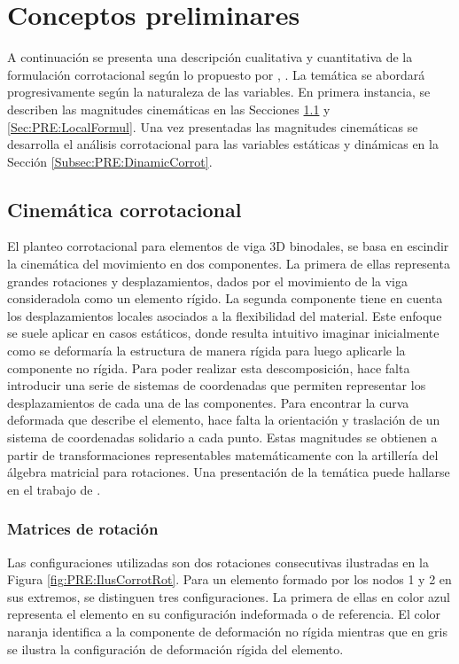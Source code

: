 \chapter{Conceptos preliminares}\label{Cap:Preliminares}
\linenumbers

A continuación se presenta una descripción cualitativa y cuantitativa de la formulación corrotacional según lo propuesto por \cite{Le2014}, \citep{Battini2002}. La temática se abordará progresivamente según la naturaleza de las variables. En primera instancia, se describen las magnitudes cinemáticas en las Secciones \ref{Subsec:PRE:CienmaticCorrot} y \ref{Sec:PRE:LocalFormul}. Una vez presentadas las magnitudes cinemáticas se desarrolla el análisis corrotacional para las variables estáticas y dinámicas en la Sección \ref{Subsec:PRE:DinamicCorrot}.


\section{Cinemática corrotacional}\label{Subsec:PRE:CienmaticCorrot}


El planteo corrotacional para elementos de viga 3D binodales, se basa en escindir la cinemática del movimiento en dos componentes. La primera de ellas representa grandes rotaciones y desplazamientos, dados por el movimiento de la viga consideradola como un elemento rígido. La segunda componente tiene en cuenta los desplazamientos locales asociados a la flexibilidad del material. Este enfoque se suele aplicar en casos estáticos, donde resulta intuitivo imaginar inicialmente como se deformaría la estructura de manera rígida para luego aplicarle la componente no rígida. Para poder realizar esta descomposición, hace falta introducir una serie de sistemas de coordenadas que permiten representar los desplazamientos de cada una de las componentes. Para encontrar la curva deformada que describe el elemento, hace falta la orientación y traslación de un sistema de coordenadas solidario a cada punto. Estas magnitudes se obtienen a partir de transformaciones representables matemáticamente con la artillería del álgebra matricial para rotaciones. Una presentación de la temática puede hallarse en el trabajo de \cite{kovzar1995finite}.

\subsection{Matrices de rotación}

Las configuraciones utilizadas son dos rotaciones consecutivas ilustradas en la Figura \ref{fig:PRE:IlusCorrotRot}. Para un elemento formado por los nodos 1 y 2 en sus extremos, se distinguen tres configuraciones. La primera de ellas en color azul representa el elemento en su configuración indeformada o de referencia. El color naranja identifica a la componente de deformación no rígida mientras que en gris se ilustra la configuración de deformación rígida del elemento.

